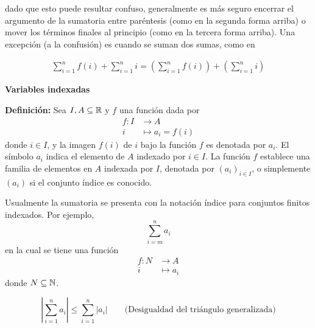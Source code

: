 dado que esto puede resultar confuso, generalmente es más seguro encerrar el argumento de la sumatoria entre paréntesis (como en la segunda forma arriba) o mover los términos finales al principio (como en la tercera forma arriba). Una excepción (a la confusión) es cuando se suman dos sumas, como en

\begin{align*}
  \sum_{i=1}^{n} f(i) + \sum_{i=1}^{n} i = \left(\sum_{i=1}^{n}f(i)\right) + \left(\sum_{i=1}^{n}i\right)
\end{align*}

\textbf{Variables indexadas}

\textbf{Definición:} Sea $I, A\subseteq \mathbb{R}$ y $f$ una función dada por
\begin{align*}
  f : I &\to A\\
  i &\mapsto a_i = f(i) 
\end{align*}
donde $i\in I$, y la imagen $f(i)$ de $i$ bajo la función $f$ es denotada por $a_i$. El símbolo $a_i$ indica el elemento de $A$ indexado por $i\in I$. La función $f$ establece una familia de elementos en $A$ indexada por $I$, denotada por $(a_i)_{i\in I}$, o simplemente $(a_i)$ si el conjunto índice es conocido.


Usualmente la sumatoria se presenta con la notación índice para conjuntos finitos indexados. Por ejemplo, \[\sum_{i=m}^{n} a_i\]
en la cual se tiene una función%
\begin{align*}
f : N &\to A\\
i &\mapsto a_i
\end{align*}
donde $N\subseteq \mathbb{N}$.

\[\left| \sum_{i=1}^{n} a_i \right| \leq \sum_{i=1}^{n} |a_i| \qquad \text{(Desigualdad del triángulo generalizada)}\]

